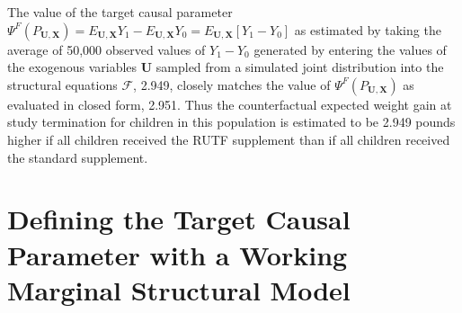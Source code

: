 \documentclass{article}\usepackage[]{graphicx}\usepackage[]{xcolor}
\begin{document}
\begin{enumerate}[label=\textbf{\arabic*.}]
The value of the target causal parameter $\Psi^F(P_{\bm{U},\bm{X}}) = E_{\bm{U},\bm{X}}Y_1 - E_{\bm{U},\bm{X}}Y_0 = E_{\bm{U},\bm{X}}[Y_1 - Y_0]$ as estimated by taking the average of 50,000 observed values of $Y_1 - Y_0$ generated by entering the values of the exogenous variables $\bm{U}$ sampled from a simulated joint distribution into the structural equations $\mathcal{F}$, 2.949, closely matches the value of $\Psi^F(P_{\bm{U},\bm{X}})$ as evaluated in closed form, 2.951. Thus the counterfactual expected weight gain at study termination for children in this population is estimated to be 2.949 pounds higher if all children received the RUTF supplement than if all children received the standard supplement.

    \end{enumerate}

\pagebreak

  
\section{Defining the Target Causal Parameter with a Working Marginal Structural Model}
\end{document}
